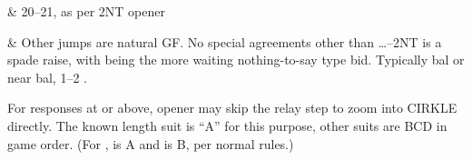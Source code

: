 \documentclass[tom-ari]{subfile}
\begin{document}
	\begin{bidtable}{}
		& 20--21, as per 2NT opener
	\end{bidtable}

	\begin{bidtable}{}
		& Other jumps are natural GF.  No special agreements other than \ldots{}--2NT is a spade raise, with  being the more waiting nothing-to-say type bid. Typically bal or near bal, 1--2 \spadesuit.
	\end{bidtable}

	For responses at  or above, opener may skip the relay step to zoom into CIRKLE directly. The known length suit is ``A'' for this purpose, other suits are BCD in game order.  (For , \heartsuit is A and \spadesuit is B, per normal rules.)
\end{document}
